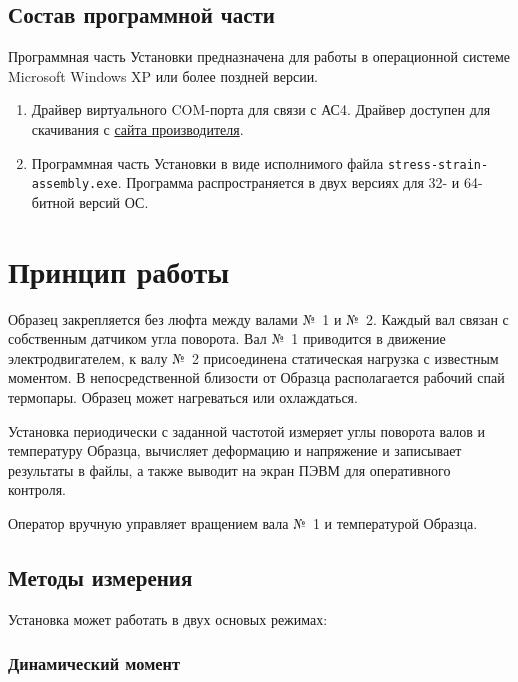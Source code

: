 \documentclass[12pt, a4paper, twocolumn]{book}
\begin{document}
\subsection{Состав программной части}
\label{sec_software}

Программная часть Установки предназначена для работы в операционной системе Microsoft Windows XP или более поздней версии.

\begin{enumerate}

\item Драйвер виртуального COM-порта для связи с АС4. Драйвер доступен для скачивания с \href{http://www.owen.ru/catalog/avtomaticheskij_preobrazovatel_interfejsov_usb_rs_485_owen_as4/opisanie}{сайта производителя}.

\item Программная часть Установки в виде исполнимого файла {\tt stress-strain-assembly.exe}. Программа распространяется в двух версиях для 32- и 64-битной версий ОС.

\end{enumerate}

\section{Принцип работы}

Образец закрепляется без люфта между валами №~1 и №~2. Каждый вал связан с собственным датчиком угла поворота. Вал №~1 приводится в движение электродвигателем, к валу №~2 присоединена статическая нагрузка с известным моментом. В непосредственной близости от Образца располагается рабочий спай термопары. Образец может нагреваться или охлаждаться.

Установка периодически с заданной частотой измеряет углы поворота валов и температуру Образца, вычисляет деформацию и напряжение и записывает результаты в файлы, а также выводит на экран ПЭВМ для оперативного контроля.

Оператор вручную управляет вращением вала №~1 и температурой Образца.

\subsection{Методы измерения}
\label{sec_measurement_method}

Установка может работать в двух основых режимах:

\subsubsection{Динамический момент}
\end{document}
